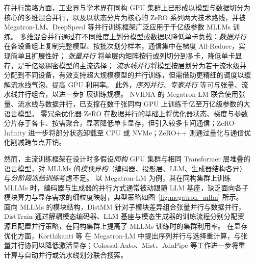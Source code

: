 在并行策略方面，工业界与学术界在同构 GPU 集群上已形成以模型与数据切分为核心的多维混合并行，以及以状态分片为核心的 ZeRO 系列两大技术路线，并被 Megatron-LM、DeepSpeed 等并行训练框架广泛应用于千亿级参数 MLLMs 训练\cite{megatron2021,zero2020,zero2021}。
多维混合并行通过在不同维度上划分模型或数据以降低单卡负载：\emph{数据并行}\cite{pytorch_ddp,sergeev2018horovod} 在各设备组上复制完整模型、按批次划分样本，通信集中在梯度 All-Reduce，实现简单且扩展性好；
\emph{张量并行}\cite{megatron2020,megatron2021} 将单层内矩阵按行或列切分到多卡，降低单卡显存，是千亿级稠密模型的主流选择；
\emph{流水线并行}将模型按层划分为若干流水级并分配到不同设备，有效支持超大规模模型的并行训练，但需借助更精细的调度以缓解流水线气泡、提高 GPU 利用率。
此外，\emph{序列并行}\cite{megatron2021}、\emph{专家并行}\cite{gshard} 等可与张量、流水线并行组合，以进一步扩展训练规模。
NVIDIA 的 Megatron-LM\cite{megatron2021,megatron2020} 联合使用张量、流水线与数据并行，已支撑在数千张同构 GPU 上训练千亿至万亿级参数的大语言模型。
零冗余优化器 ZeRO\cite{zero2020,zero2021} 在数据并行的基础上将优化器状态、梯度与参数分片存于各卡、按需聚合，显著降低单卡显存，但引入较多卡间通信；ZeRO-Infinity\cite{zero2021} 进一步将部分状态卸载至 CPU 或 NVMe；ZeRO++\cite{zeroplusplus} 则通过量化与通信优化削减跨节点开销。



然而，主流训练框架在设计时多假设\emph{同构} GPU 集群与相同 Transformer 层堆叠的语言模型，对 MLLMs 的\emph{模块异构}（编码器、投影层、LLM、生成器结构各异）与\emph{分阶段冻结训练}考虑不足。
以 Megatron-LM 为例，其在同构集群上训练 MLLMs 时，编码器与生成器的并行方式通常被动跟随 LLM 基座，缺乏面向各子模块算力与显存需求的细粒度映射，典型策略如图~\ref{fig:megatron_mllm} 所示\cite{disttrain2025}。
面向 MLLMs 的模块结构，DistMM\cite{distmm2024} 针对子模块差异组合张量并行与数据并行，DistTrain\cite{disttrain2025} 通过解耦模态编码器、LLM 基座与模态生成器的训练流程分别分配资源且配置并行策略，在同构集群上提高了 MLLMs 训练时的集群利用率。
在显存优化方面，Korthikanti 等\cite{megatron2023} 在 Megatron-LM 中提出序列并行与选择重计算，与张量并行协同以降低激活显存；Colossal-Auto\cite{colossal_auto}、Mist\cite{mist2025}、AdaPipe\cite{adapipe2024} 等工作进一步将重计算与自动并行或流水线划分联合搜索。

